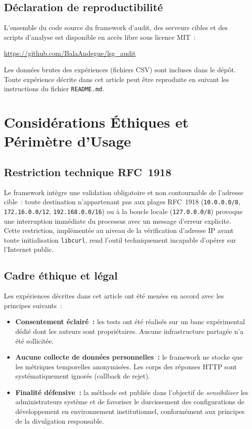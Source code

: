 \documentclass[10pt,conference,compsoc]{IEEEtran}
\begin{document}
\subsection{Déclaration de reproductibilité}
L'ensemble du code source du framework d'audit, des serveurs cibles et
des scripts d'analyse est disponible en accès libre sous licence MIT~:

\begin{center}
\url{https://github.com/BalaAndegue/lsg_audit}
\end{center}

Les données brutes des expériences (fichiers CSV) sont incluses dans
le dépôt. Toute expérience décrite dans cet article peut être reproduite
en suivant les instructions du fichier \texttt{README.md}.

\section{Considérations Éthiques et Périmètre d'Usage}
\label{sec:ethique}

\subsection{Restriction technique RFC~1918}
Le framework intègre une validation obligatoire et non contournable
de l'adresse cible~: toute destination n'appartenant pas aux plages
RFC~1918 (\texttt{10.0.0.0/8}, \texttt{172.16.0.0/12},
\texttt{192.168.0.0/16}) ou à la boucle locale (\texttt{127.0.0.0/8})
provoque une interruption immédiate du processus avec un message
d'erreur explicite. Cette restriction, implémentée au niveau de la
vérification d'adresse IP avant toute initialisation \texttt{libcurl},
rend l'outil techniquement incapable d'opérer sur l'Internet public.

\subsection{Cadre éthique et légal}
Les expériences décrites dans cet article ont été menées en accord avec
les principes suivants~:
\begin{itemize}
    \item \textbf{Consentement éclairé~:} les tests ont été réalisés sur
      un banc expérimental dédié dont les auteurs sont propriétaires.
      Aucune infrastructure partagée n'a été sollicitée.
    \item \textbf{Aucune collecte de données personnelles~:} le framework
      ne stocke que les métriques temporelles anonymisées. Les corps des
      réponses HTTP sont systématiquement ignorés (callback de rejet).
    \item \textbf{Finalité défensive~:} la méthode est publiée dans
      l'objectif de \textit{sensibiliser} les administrateurs système et
      de favoriser le durcissement des configurations de développement
      en environnement institutionnel, conformément aux principes de
      la divulgation responsable.
\end{itemize}
\end{document}
